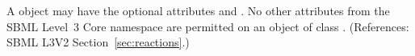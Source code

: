 A \ListOfModifierSpeciesReferences object may have the optional attributes
  and .  No other attributes from the SBML
Level~3 Core namespace are permitted on an object of class
\ListOfModifierSpeciesReferences.  (References: SBML L3V2
Section~\ref{sec:reactions}.)
